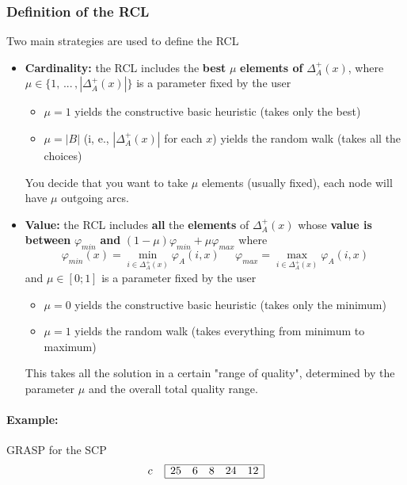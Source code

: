 \documentclass[11pt]{article}
\begin{document}
	\subsubsection{Definition of the RCL}
	Two main strategies are used to define the RCL
	\begin{itemize}
		\item \textbf{Cardinality:} the RCL includes the \textbf{best} $\mu$ \textbf{elements of} $\Delta_A^+ (x)$, where $\mu \in \{1,\, ... \, , |\Delta_A^+(x)|\}$ is a parameter fixed by the user
		\begin{itemize}
			\item $\mu = 1$ yields the constructive basic heuristic (takes only the best)
			\item $\mu = |B|$ (i, e., $|\Delta_A^+ (x)|$ for each $x$) yields the random walk (takes all the choices)
		\end{itemize}
		You decide that you want to take $\mu$ elements (usually fixed), each node will have $\mu$ outgoing arcs.\\
		
		\item \textbf{Value:} the RCL includes \textbf{all} the \textbf{elements} of $\Delta_A^+ (x)$ whose \textbf{value is between} $\varphi_{min}$ \textbf{and} $(1 − \mu) \varphi_{min} + \mu \varphi_{max}$ where
		$$ \varphi_{min} (x) = \min_{i \in \Delta_A^+ (x)} \varphi_A (i,x) \;\;\;\;\; \varphi_{max} = \max_{i \in \Delta_A^+ (x)} \varphi_A (i,x) $$
		and $\mu \in [0; 1]$ is a parameter fixed by the user
		\begin{itemize}
			\item $\mu = 0$ yields the constructive basic heuristic (takes only the minimum)
			\item $\mu = 1$ yields the random walk (takes everything from minimum to maximum)
		\end{itemize}
		This takes all the solution in a certain "range of quality", determined by the parameter $\mu$ and the overall total quality range.\\
	\end{itemize}
	
	\newpage
	
	\paragraph{Example:} GRASP for the SCP 
	$$
	c \;\;\;\;
	\begin{array}{| c c c c c |}
		\hline
		25 & 6 & 8 & 24 & 12 \\
		\hline
	\end{array}
	$$
	
\end{document}
